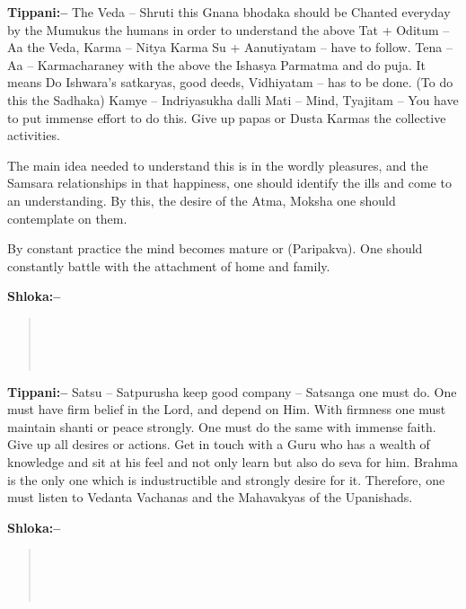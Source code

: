\textbf{Tippani:–} The Veda – Shruti this Gnana bhodaka should be Chanted everyday by the Mumukus the humans in order to understand the above Tat + Oditum – Aa the Veda, Karma – Nitya Karma Su + Aanutiyatam – have to follow. Tena – Aa – Karmacharaney with the above the Ishasya Parmatma and do puja. It means Do Ishwara's satkaryas, good deeds, Vidhiyatam – has to be done. (To do this the Sadhaka) Kamye – Indriyasukha dalli Mati – Mind, Tyajitam – You have to put immense effort to do this. Give up papas or Dusta Karmas the collective activities.

The main idea needed to understand this is in the wordly pleasures, and the Samsara relationships in that happiness, one should identify the ills and come to an understanding. By this, the desire of the Atma, Moksha one should contemplate on them.

By constant practice the mind becomes mature or (Paripakva). One should constantly battle with the attachment of home and family.

\textbf{Shloka:–}

\begin{verse}
 \\\\\\ 
\end{verse}

\textbf{Tippani:–} Satsu – Satpurusha keep good company – Satsanga one must do. One must have firm belief in the Lord, and depend on Him. With firmness one must maintain shanti or peace strongly. One must do the same with immense faith. Give up all desires or actions. Get in touch with a Guru who has a wealth of knowledge and sit at his feel and not only learn but also do seva for him. Brahma is the only one which is industructible and strongly desire for it. Therefore, one must listen to Vedanta Vachanas and the Mahavakyas of the Upanishads.

\textbf{Shloka:–}

\begin{verse}
 \\\\\\ 
\end{verse}

